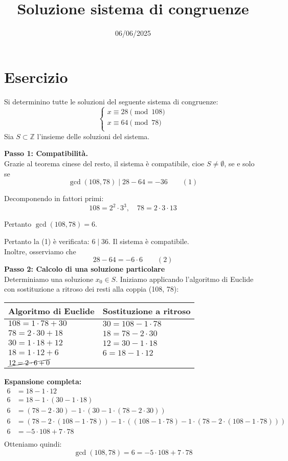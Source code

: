 \documentclass[12pt]{article}
\begin{document}
\title{Soluzione sistema di congruenze}
\date{06/06/2025}
\maketitle
\section*{Esercizio}
Si determinino tutte le soluzioni del seguente sistema di congruenze:
\[
\begin{cases}
x \equiv 28 \pmod{108} \\
x \equiv 64 \pmod{78} \\
\end{cases}
\]
Sia $S \subset \mathbb{Z}$ l'insieme delle soluzioni del sistema.

\textbf{Passo 1: Compatibilità.} \\ 
Grazie al teorema cinese del resto, il sistema è compatibile, cioe $S \neq \emptyset$, se e solo se
$$\gcd(108, 78) \mid 28 - 64 = -36 \qquad (1)$$

Decomponendo in fattori primi:
$$108 = 2^{2} \cdot 3^{3}, \quad 78 = 2 \cdot 3 \cdot 13$$

Pertanto $\gcd(108, 78) = 6$.

Pertanto la (1) è verificata: $6 \mid 36$. Il sistema è compatibile.\\
Inoltre, osserviamo che $$28 - 64 = -6 \cdot 6 \qquad (2)$$
\textbf{Passo 2: Calcolo di una soluzione particolare} \\
Determiniamo una soluzione $x_0 \in S$.
Iniziamo applicando l'algoritmo di Euclide con sostituzione a ritroso dei resti alla coppia (108, 78):
\begin{center}
\setlength{\arrayrulewidth}{0.5pt}
\begin{tabular}{|p{5cm}|p{9cm}|}
\hline
\textbf{Algoritmo di Euclide} & \textbf{Sostituzione a ritroso} \\
\hline
$108 = 1 \cdot  78 + 30$ & $30 = 108 - 1 \cdot  78$ \\
\hline
$78 = 2 \cdot  30 + 18$ & $18 = 78 - 2 \cdot  30$ \\
\hline
$30 = 1 \cdot  18 + 12$ & $12 = 30 - 1 \cdot  18$ \\
\hline
$18 = 1 \cdot  12 + 6$ & $6 = 18 - 1 \cdot  12$ \\
\hline
$\cancel{12 = 2 \cdot  6 + 0}$ & \\
\hline
\end{tabular}
\end{center}
\textbf{Espansione completa:}
\begin{align*}
6 &= 18 - 1\cdot12\\
6 &= 18 - 1\cdot(30 - 1\cdot18)\\
6 &= (78 - 2\cdot30) - 1\cdot(30 - 1\cdot(78 - 2\cdot30))\\
6 &= (78 - 2\cdot(108 - 1\cdot78)) - 1\cdot((108 - 1\cdot78) - 1\cdot(78 - 2\cdot(108 - 1\cdot78)))\\
6 &= -5\cdot108 + 7\cdot78\\
\end{align*}
Otteniamo quindi: $$\gcd(108, 78) = 6 = -5 \cdot 108 + 7 \cdot 78$$
\end{document}
